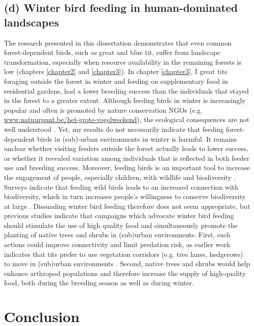 \documentclass[10pt, twoside]{book} %
\begin{document}
	\subsection*{(d) Winter bird feeding in human-dominated landscapes}
	The research presented in this dissertation demonstrates that even common forest-dependent birds, such as great and blue tit, suffer from landscape transformation, especially when resource availability in the remaining forests is low (chapters \ref{chapter2} and \ref{chapter3}). In chapter \ref{chapter3}, I great tits foraging outside the forest in winter and feeding on supplementary food in residential gardens, had a lower breeding success than the individuals that stayed in the forest to a greater extent. Although feeding birds in winter is increasingly popular and often is promoted by nature conservation NGOs (e.g. \url{www.natuurpunt.be/het-grote-vogelweekend}), the ecological consequences are not well understood \citep{Robb2008, Jones2011, Cox2018}. Yet, my results do not necessarily indicate that feeding forest-dependent birds in (sub)-urban environments in winter is harmful. It remains unclear whether visiting feeders outside the forest actually leads to lower success, or whether it revealed variation among individuals that is reflected in both feeder use and breeding success. Moreover, feeding birds is an important tool to increase the engagement of people, especially children, with wildlife and biodiversity \citep{Robb2008a}. Surveys indicate that feeding wild birds leads to an increased connection with biodiversity, which in turn increases people's willingness to conserve biodiversity at large \citep{Cox2018, White2018}. Dissuading winter bird feeding therefore does not seem appropriate, but previous studies indicate that campaigns which advocate winter bird feeding should stimulate the use of high quality food and simultaneously promote the planting of native trees and shrubs in (sub)urban environments. First, such actions could improve connectivity and limit predation risk, as earlier work indicates that tits prefer to use vegetation corridors (e.g. tree lanes, hedgerows) to move in (sub)urban environments \citep{Cox2016}. Second, native trees and shrubs would help enhance arthropod populations and therefore increase the supply of high-quality food, both during the breeding season \citep{Seress2020} as well as during winter.
	
\clearpage	
	\section{Conclusion}
\end{document}
